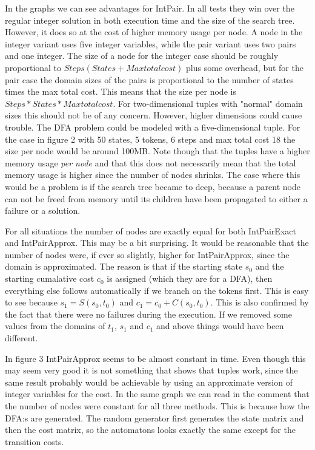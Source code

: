 \documentclass[a4paper,11pt]{article}
\begin{document}
In the graphs we can see advantages for IntPair. In all tests they win over the regular integer solution in both execution time and the size of the search tree. However, it does so at the cost of higher memory usage per node. A node in the integer variant uses five integer variables, while the pair variant uses two pairs and one integer. The size of a node for the integer case should be roughly proportional to $Steps(States + Maxtotalcost)$ plus some overhead, but for the pair case the domain sizes of the pairs is proportional to the number of states times the max total cost. This means that the size per node is $Steps*States*Maxtotalcost$. For two-dimensional tuples with "normal" domain sizes this should not be of any concern. However, higher dimensions could cause trouble. The DFA problem could be modeled with a five-dimensional tuple. For the case in figure 2 with 50 states, 5 tokens, 6 steps and max total cost 18 the size per node would be around 100MB. Note though that the tuples have a higher memory usage \textit{per node} and that this does not necessarily mean that the total memory usage is higher since the number of nodes shrinks. The case where this would be a problem is if the search tree became to deep, because a parent node can not be freed from memory until its children have been propagated to either a failure or a solution.

For all situations the number of nodes are exactly equal for both IntPairExact and IntPairApprox. This may be a bit surprising. It would be reasonable that the number of nodes were, if ever so slightly, higher for IntPairApprox, since the domain is approximated. The reason is that if the starting state $s_0$ and the starting cumalative cost $c_0$ is assigned (which they are for a DFA), then everything else follows automatically if we branch on the tokens first. This is easy to see because $s_1=S(s_0, t_0)$ and $c_1=c_0+C(s_0, t_0)$. This is also confirmed by the fact that there were no failures during the execution. If we removed some values from the domains of $t_1$, $s_1$ and $c_1$ and above things would have been different. 

In figure 3 IntPairApprox seems to be almost constant in time. Even though this may seem very good it is not something that shows that tuples work, since the same result probably would be achievable by using an approximate version of integer variables for the cost. In the same graph we can read in the comment that the number of nodes were constant for all three methods. This is because how the DFA:s are generated. The random generator first generates the state matrix and then the cost matrix, so the automatons looks exactly the same except for the transition costs.
\end{document}
